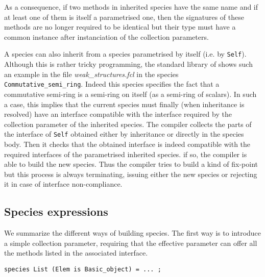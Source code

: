 As a consequence, if two methods in inherited species have the same
name and if at least one of them is itself a parametrised one, then
the signatures of these methods are no longer required to be identical
but their type must have a common instance after instanciation of the
collection parameters.

A species can also inherit from a species parametrised by itself
(i.e. by {\tt Self}). Although this is rather tricky programming, the
standard library of {\focal} shows such an example in the file {\em
  weak\_structures.fcl} in the species {\tt
  Commutative\_semi\_ring}. Indeed this species specifies the fact
that a commutative semi-ring is a semi-ring on itself (as a semi-ring
of scalars).  In such a case, this implies that the current species
must finally (when inheritance is resolved) have an interface
compatible with the interface required by the collection parameter of
the inherited species. The {\focal} compiler collects the parts of the
interface of {\tt Self} obtained either by inheritance or directly in
the species body. Then it checks that the obtained interface is indeed
compatible with the required interfaces of the parametrised inherited
species. if so, the compiler is able to build the new species. Thus
the compiler tries to build a kind of fix-point but  this process is
always terminating, issuing either the new species or rejecting it in
case of interface non-compliance.



\subsection{Species expressions}
We summarize the different ways of building species. The first way is
to introduce a simple collection parameter, requiring that the
effective parameter can offer all the methods listed in the associated
interface.

{\scriptsize
\begin{lstlisting}
species List (Elem is Basic_object) = ... ;
\end{lstlisting}
}

